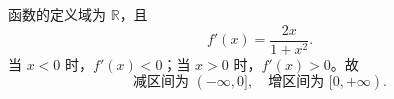 函数的定义域为 $\mathbb R$，且
\[
f'(x)=\frac{2x}{1+x^2}.
\]
当 $x<0$ 时，$f'(x)<0$；当 $x>0$ 时，$f'(x)>0$。故
\[
\boxed{\text{减区间为 }(-\infty,0],\quad\text{增区间为 }[0,+\infty).}
\]
